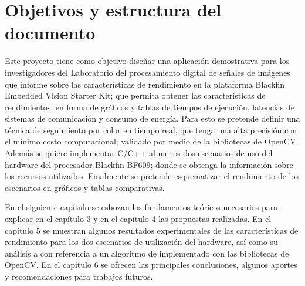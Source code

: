 \section{Objetivos y estructura del documento}


Este proyecto tiene como objetivo diseñar una aplicación demostrativa para los investigadores del Laboratorio
del procesamiento digital de señales de imágenes que informe sobre las características de rendimiento en la plataforma Blackfin Embedded Vision Starter Kit; que permita obtener las características de rendimientos, en forma de gráficos y tablas de tiempos de ejecución, latencias de sistemas de comunicación y consumo de energía. Para esto se pretende definir una técnica de seguimiento por color en tiempo real, que tenga una alta precisión con el mínimo costo computacional; validado por medio de la bibliotecas de OpenCV. Además se quiere implementar C/C++ al menos dos escenarios de uso del hardware del procesador Blackfin BF609; donde se obtenga la información sobre los recursos utilizados. Finalmente se pretende esquematizar el rendimiento de los escenarios en gráficos y tablas comparativas. 

En el siguiente capítulo se esbozan los fundamentos teóricos necesarios para explicar en el capítulo 3 y en el capitulo 4 las propuestas realizadas. En el capítulo 5 se muestran algunos resultados experimentales de las características de rendimiento para los dos escenarios de utilización del hardware, así como su análisis a con referencia a un algoritmo de implementado con las bibliotecas de OpenCV. En el capítulo 6 se ofrecen las principales conclusiones, algunos aportes y recomendaciones para trabajos futuros.


